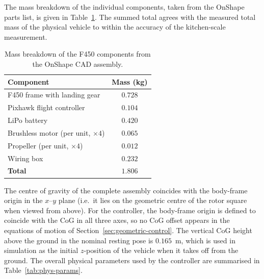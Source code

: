 \documentclass[11pt]{article}
\theoremstyle{remark}
\begin{document}
The mass breakdown of the individual components, taken from the OnShape parts list, is given in Table~\ref{tab:mass-breakdown}. The summed total agrees with the measured total mass of the physical vehicle to within the accuracy of the kitchen-scale measurement.

\begin{table}[H]
    \centering
    \caption{Mass breakdown of the F450 components from the OnShape CAD assembly.}
    \label{tab:mass-breakdown}
    \begin{tabular}{lc}
        \toprule
        Component                               & Mass (kg) \\
        \midrule
        F450 frame with landing gear            & $0.728$ \\
        Pixhawk flight controller               & $0.104$ \\
        LiPo battery                            & $0.420$ \\
        Brushless motor (per unit, $\times 4$)  & $0.065$ \\
        Propeller (per unit, $\times 4$)        & $0.012$ \\
        Wiring box                              & $0.232$ \\
        \midrule
        \textbf{Total}                          & $\mathbf{1.806}$ \\
        \bottomrule
    \end{tabular}
\end{table}

The centre of gravity of the complete assembly coincides with the body-frame origin in the $x$--$y$ plane (i.e.\ it lies on the geometric centre of the rotor square when viewed from above). For the controller, the body-frame origin is defined to coincide with the CoG in all three axes, so no CoG offset appears in the equations of motion of Section~\ref{sec:geometric-control}. The vertical CoG height above the ground in the nominal resting pose is $0.165$~m, which is used in simulation as the initial $z$-position of the vehicle when it takes off from the ground. The overall physical parameters used by the controller are summarised in Table~\ref{tab:phys-params}.
\end{document}
